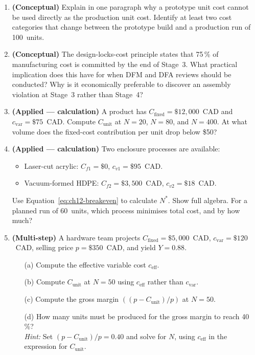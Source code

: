 \begin{enumerate}
  \item \textbf{(Conceptual)} Explain in one paragraph why a prototype
        unit cost cannot be used directly as the production unit cost.
        Identify at least two cost categories that change between the prototype
        build and a production run of 100~units.

  \item \textbf{(Conceptual)} The design-locks-cost principle states that
        75\,\% of manufacturing cost is committed by the end of Stage~3.
        What practical implication does this have for when DFM and DFA
        reviews should be conducted?
        Why is it economically preferable to discover an assembly violation
        at Stage~3 rather than Stage~4?

  \item \textbf{(Applied --- calculation)} A product has
        $C_{\text{fixed}} = \$12{,}000$~CAD and $c_{\text{var}} = \$75$~CAD.
        Compute $C_{\text{unit}}$ at $N = 20$, $N = 80$, and $N = 400$.
        At what volume does the fixed-cost contribution per unit drop below
        \$50?

  \item \textbf{(Applied --- calculation)} Two enclosure processes are
        available:
        \begin{itemize}
          \item Laser-cut acrylic: $C_{f1} = \$0$, $c_{v1} = \$95$~CAD.
          \item Vacuum-formed HDPE: $C_{f2} = \$3{,}500$~CAD,
                $c_{v2} = \$18$~CAD.
        \end{itemize}
        Use Equation~\ref{eq:ch12-breakeven} to calculate $N^{*}$.
        Show full algebra.
        For a planned run of 60~units, which process minimises total cost,
        and by how much?

  \item \textbf{(Multi-step)} A hardware team projects
        $C_{\text{fixed}} = \$5{,}000$~CAD, $c_{\text{var}} = \$120$~CAD,
        selling price $p = \$350$~CAD, and yield $Y = 0.88$.
        \begin{enumerate}
          \item[(a)] Compute the effective variable cost $c_{\text{eff}}$.
          \item[(b)] Compute $C_{\text{unit}}$ at $N = 50$ using
                $c_{\text{eff}}$ rather than $c_{\text{var}}$.
          \item[(c)] Compute the gross margin $((p - C_{\text{unit}})/p)$
                at $N = 50$.
          \item[(d)] How many units must be produced for the gross margin
                to reach 40\,\%?
                \\\noindent\textit{Hint:} Set $(p - C_{\text{unit}})/p = 0.40$ and solve for $N$, using $c_{\text{eff}}$ in the expression for $C_{\text{unit}}$.
        \end{enumerate}
\end{enumerate}


